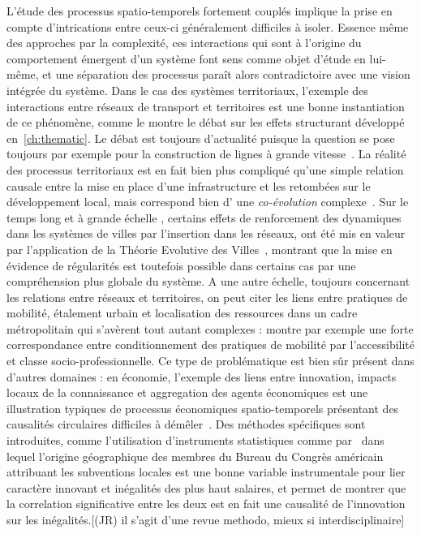 {
L'étude des processus spatio-temporels fortement couplés implique la prise en compte d'intrications entre ceux-ci généralement difficiles à isoler. Essence même des approches par la complexité, ces interactions qui sont à l'origine du comportement émergent d'un système font sens comme objet d'étude en lui-même, et une séparation des processus paraît alors contradictoire avec une vision intégrée du système. Dans le cas des systèmes territoriaux, l'exemple des interactions entre réseaux de transport et territoires est une bonne instantiation de ce phénomène, comme le montre le débat sur les effets structurant développé en~\ref{ch:thematic}. Le débat est toujours d'actualité puisque la question se pose toujours par exemple pour la construction de lignes à grande vitesse~\cite{crozethalshs01094554}. La réalité des processus territoriaux est en fait bien plus compliqué  qu'une simple relation causale entre la mise en place d'une infrastructure et les retombées sur le développement local, mais correspond bien d'  une \emph{co-évolution} complexe~\cite{bretagnolletel00459720}. Sur le temps long et à grande échelle , certains effets de renforcement des dynamiques dans les systèmes de villes par l'insertion dans les réseaux, ont été mis en valeur par l'application de la Théorie Evolutive des Villes~\cite{espacegeo2014effets}, montrant que la mise en évidence de régularités est toutefois possible dans certains cas par une compréhension plus globale du système. A une autre échelle, toujours concernant les relations entre réseaux et territoires, on peut citer les liens entre pratiques de mobilité, étalement urbain et localisation des ressources dans un cadre métropolitain qui s'avèrent tout autant complexes : \cite{cerqueira2017inegalites} montre par exemple une forte correspondance entre conditionnement des pratiques de mobilité par l'accessibilité et classe socio-professionnelle. Ce type de problématique est bien sûr présent dans d'autres domaines : en économie, l'exemple des liens entre innovation, impacts locaux de la connaissance et aggregation  des agents économiques est une illustration typiques de processus économiques spatio-temporels présentant des causalités circulaires difficiles à démêler~\cite{audretsch1996r}. Des méthodes spécifiques sont introduites, comme l'utilisation d'instruments statistiques comme par~\cite{aghion2015innovation} dans lequel l'origine géographique des membres du Bureau du Congrès américain attribuant les subventions locales est une bonne variable instrumentale pour lier caractère innovant et inégalités des plus haut  salaires, et permet de montrer que la correlation  significative entre les deux est en fait une causalité de l'innovation sur les inégalités.[(JR) il s'agit d'une revue methodo, mieux si interdisciplinaire] 
}



